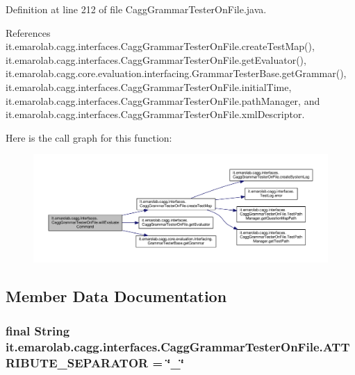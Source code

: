 Definition at line 212 of file Cagg\-Grammar\-Tester\-On\-File.\-java.



References it.\-emarolab.\-cagg.\-interfaces.\-Cagg\-Grammar\-Tester\-On\-File.\-create\-Test\-Map(), it.\-emarolab.\-cagg.\-interfaces.\-Cagg\-Grammar\-Tester\-On\-File.\-get\-Evaluator(), it.\-emarolab.\-cagg.\-core.\-evaluation.\-interfacing.\-Grammar\-Tester\-Base.\-get\-Grammar(), it.\-emarolab.\-cagg.\-interfaces.\-Cagg\-Grammar\-Tester\-On\-File.\-initial\-Time, it.\-emarolab.\-cagg.\-interfaces.\-Cagg\-Grammar\-Tester\-On\-File.\-path\-Manager, and it.\-emarolab.\-cagg.\-interfaces.\-Cagg\-Grammar\-Tester\-On\-File.\-xml\-Descriptor.



Here is the call graph for this function\-:\nopagebreak
\begin{figure}[H]
\begin{center}
\leavevmode
\includegraphics[width=350pt]{classit_1_1emarolab_1_1cagg_1_1interfaces_1_1CaggGrammarTesterOnFile_ac48c3883379570891ba38287384a9b6a_cgraph}
\end{center}
\end{figure}




\subsection{Member Data Documentation}
\hypertarget{classit_1_1emarolab_1_1cagg_1_1interfaces_1_1CaggGrammarTesterOnFile_a01dd67381230b209dee66ac505842a81}{
\subsubsection[{A\-T\-T\-R\-I\-B\-U\-T\-E\-\_\-\-S\-E\-P\-A\-R\-A\-T\-O\-R}]{\setlength{\rightskip}{0pt plus 5cm}final String it.\-emarolab.\-cagg.\-interfaces.\-Cagg\-Grammar\-Tester\-On\-File.\-A\-T\-T\-R\-I\-B\-U\-T\-E\-\_\-\-S\-E\-P\-A\-R\-A\-T\-O\-R = \char`\"{}\-\_\-\char`\"{}\hspace{0.3cm}{\ttfamily [static]}}}\label{classit_1_1emarolab_1_1cagg_1_1interfaces_1_1CaggGrammarTesterOnFile_a01dd67381230b209dee66ac505842a81}


